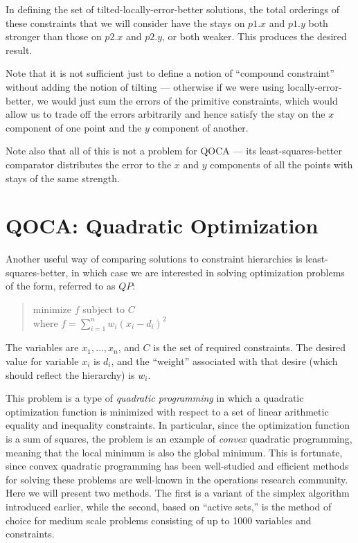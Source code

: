 \documentclass{article}
\begin{document}
In defining the set of tilted-locally-error-better solutions, the total
orderings of these constraints that we will consider have the stays on
$p1.x$ and $p1.y$ both stronger than those on $p2.x$ and $p2.y$, or both
weaker.  This produces the desired result.

Note that it is not sufficient just to define a notion of ``compound
constraint'' without adding the notion of tilting --- otherwise if we were
using locally-error-better, we would just sum the errors of the 
primitive constraints, which would allow us to trade off the errors
arbitrarily and hence satisfy the stay on the $x$ component of one point
and the $y$ component of another.

Note also that all of this is not a problem for QOCA --- its
least-squares-better comparator distributes the error to the $x$ and $y$
components of all the points with stays of the same strength.

\section{QOCA: Quadratic Optimization}
\label{quadratic}

Another useful way of comparing solutions to constraint hierarchies is
least-squares-better, in which case we are interested in
solving optimization problems of the form, referred to as $QP$:
\begin{quote}
minimize $f$ subject to $C$  \\
where $f = \sum_{i=1}^n w_i (x_i - d_i)^2$
\end{quote}\vspace{-0.9ex}
The variables are $x_1, \ldots , x_n$, and $C$  is the set of
required constraints.  The desired value for variable
$x_i$ is $d_i$, and the ``weight'' associated with that desire (which
should reflect the hierarchy) is $w_i$.

This problem is a type of {\em quadratic programming} in which a quadratic
optimization function is minimized with respect to a set of linear
arithmetic equality and inequality constraints.  In particular, since the
optimization function is a sum of squares, the problem is an example
of {\em convex} quadratic programming, meaning that the local minimum is
also the global minimum.  This is fortunate, since convex quadratic
programming has been well-studied and efficient methods for solving these
problems are well-known in the operations research community.
Here we will present two methods.
The first is a variant of the simplex algorithm introduced earlier,
while the second, based on ``active sets,''
is the method of choice for medium scale problems consisting of up to
1000 variables and constraints.
\end{document}
